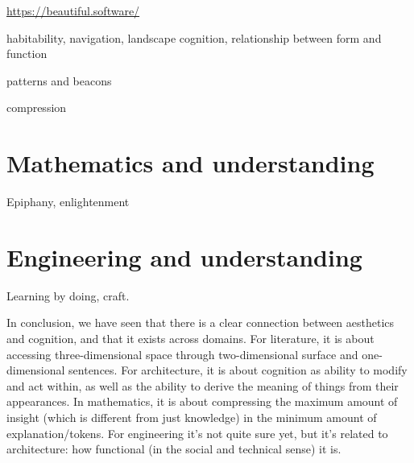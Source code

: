 \url{https://beautiful.software/}

habitability, navigation, landscape cognition, relationship between form and function

patterns and beacons

compression

\section{Mathematics and understanding}
\label{sec:aesthetic-mathematics}

Epiphany, enlightenment

\section{Engineering and understanding}
\label{sec:aesthetic-engineering}

Learning by doing, craft.

\spacer

In conclusion, we have seen that there is a clear connection between aesthetics and cognition, and that it exists across domains. For literature, it is about accessing three-dimensional space through two-dimensional surface and one-dimensional sentences. For architecture, it is about cognition as ability to modify and act within, as well as the ability to derive the meaning of things from their appearances. In mathematics, it is about compressing the maximum amount of insight (which is different from just knowledge) in the minimum amount of explanation/tokens. For engineering it's not quite sure yet, but it's related to architecture: how functional (in the social and technical sense) it is.